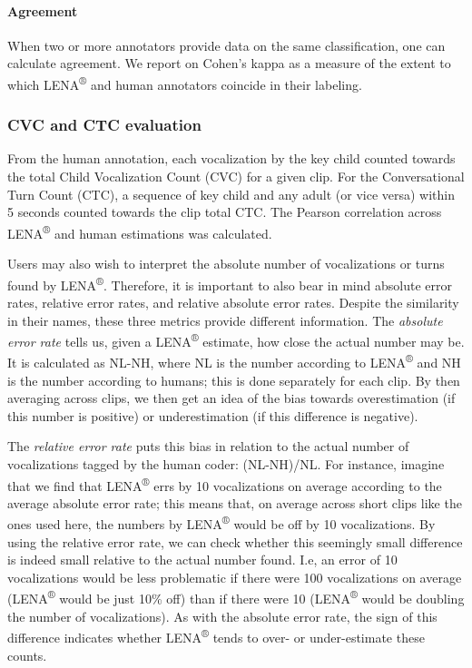 \documentclass[english,table,man,floatsintext]{apa6}
\let\oldparagraph\paragraph
\renewcommand{\paragraph}[1]{\oldparagraph{#1}\mbox{}}
\begin{document}
\hypertarget{agreement}{%
\paragraph{Agreement}\label{agreement}}

When two or more annotators provide data on the same classification, one can calculate agreement. We report on Cohen's kappa as a measure of the extent to which LENA\textsuperscript{®} and human annotators coincide in their labeling.

\hypertarget{cvc-and-ctc-evaluation}{%
\subsubsection{CVC and CTC evaluation}\label{cvc-and-ctc-evaluation}}

From the human annotation, each vocalization by the key child counted towards the total Child Vocalization Count (CVC) for a given clip. For the Conversational Turn Count (CTC), a sequence of key child and any adult (or vice versa) within 5 seconds counted towards the clip total CTC. The Pearson correlation across LENA\textsuperscript{®} and human estimations was calculated.

Users may also wish to interpret the absolute number of vocalizations or turns found by LENA\textsuperscript{®}. Therefore, it is important to also bear in mind absolute error rates, relative error rates, and relative absolute error rates. Despite the similarity in their names, these three metrics provide different information. The \emph{absolute error rate} tells us, given a LENA\textsuperscript{®} estimate, how close the actual number may be. It is calculated as NL-NH, where NL is the number according to LENA\textsuperscript{®} and NH is the number according to humans; this is done separately for each clip. By then averaging across clips, we then get an idea of the bias towards overestimation (if this number is positive) or underestimation (if this difference is negative).

The \emph{relative error rate} puts this bias in relation to the actual number of vocalizations tagged by the human coder: (NL-NH)/NL. For instance, imagine that we find that LENA\textsuperscript{®} errs by 10 vocalizations on average according to the average absolute error rate; this means that, on average across short clips like the ones used here, the numbers by LENA\textsuperscript{®} would be off by 10 vocalizations. By using the relative error rate, we can check whether this seemingly small difference is indeed small relative to the actual number found. I.e, an error of 10 vocalizations would be less problematic if there were 100 vocalizations on average (LENA\textsuperscript{®} would be just 10\% off) than if there were 10 (LENA\textsuperscript{®} would be doubling the number of vocalizations). As with the absolute error rate, the sign of this difference indicates whether LENA\textsuperscript{®} tends to over- or under-estimate these counts.
\end{document}
